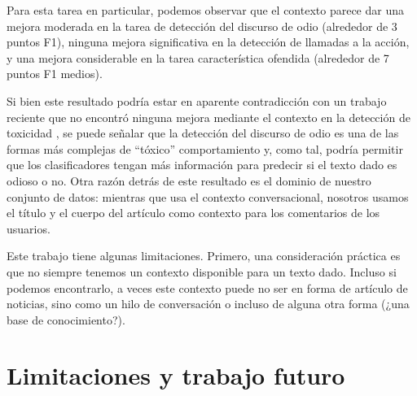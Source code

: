 Para esta tarea en particular, podemos observar que el contexto parece dar una mejora moderada en la tarea de detección del discurso de odio (alrededor de 3 puntos F1), ninguna mejora significativa en la detección de llamadas a la acción, y una mejora considerable en la tarea característica ofendida (alrededor de 7 puntos F1 medios).

Si bien este resultado podría estar en aparente contradicción con un trabajo reciente que no encontró ninguna mejora mediante el contexto en la detección de toxicidad \cite{pavlopoulos2020toxicity}, se puede señalar que la detección del discurso de odio es una de las formas más complejas de ``tóxico'' comportamiento y, como tal, podría permitir que los clasificadores tengan más información para predecir si el texto dado es odioso o no. Otra razón detrás de este resultado es el dominio de nuestro conjunto de datos: mientras que \citet{pavlopoulos2020toxicity} usa el contexto conversacional, nosotros usamos el título y el cuerpo del artículo como contexto para los comentarios de los usuarios.

Este trabajo tiene algunas limitaciones. Primero, una consideración práctica es que no siempre tenemos un contexto disponible para un texto dado. Incluso si podemos encontrarlo, a veces este contexto puede no ser en forma de artículo de noticias, sino como un hilo de conversación o incluso de alguna otra forma (¿una base de conocimiento?).

\section{Limitaciones y trabajo futuro}